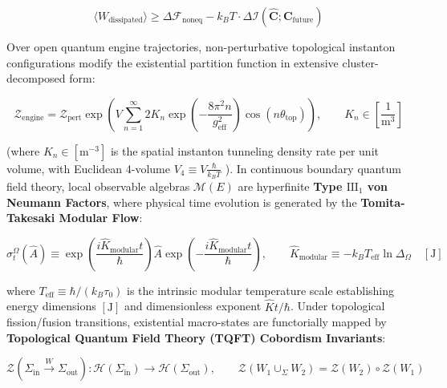 \documentclass[11pt,a4paper]{article}
\theoremstyle{definition}\newtheorem{definition}{Definition}
\theoremstyle{remark}\newtheorem{remark}{Remark}
\begin{document}
\begin{equation}
\langle W_{\text{dissipated}} \rangle \ge \Delta \mathcal{F}_{\text{noneq}} - k_B T \cdot \Delta \mathcal{I}(\hat{\mathbf{C}}; \mathbf{C}_{\text{future}})
\end{equation}


Over open quantum engine trajectories, non-perturbative topological instanton configurations modify the existential partition function in extensive cluster-decomposed form:


\begin{equation}
\boxed{\mathcal{Z}_{\text{engine}} = \mathcal{Z}_{\text{pert}} \exp\left( V \sum_{n=1}^\infty 2 K_n \exp\left( -\frac{8\pi^2 n}{g_{\text{eff}}^2} \right) \cos\left( n \theta_{\text{top}} \right) \right), \qquad K_n \in [\frac{1}{\mathrm{m^3}}]}
\end{equation}


(where $K_n \in [\mathrm{m^{-3}}]$ is the spatial instanton tunneling density rate per unit volume, with Euclidean 4-volume $V_4 \equiv V \frac{\hbar}{k_B T}$ ).
In continuous boundary quantum field theory, local observable algebras $\mathcal{M}(E)$ are hyperfinite \textbf{Type $\mathrm{III}_1$ von Neumann Factors}, where physical time evolution is generated by the \textbf{Tomita-Takesaki Modular Flow}:


\begin{equation}
\boxed{\sigma_t^{\Omega}(\hat{A}) \equiv \exp\left( \frac{i \hat{K}_{\text{modular}} t}{\hbar} \right) \hat{A} \exp\left( -\frac{i \hat{K}_{\text{modular}} t}{\hbar} \right), \qquad \hat{K}_{\text{modular}} \equiv -k_B T_{\text{eff}} \ln \Delta_{\Omega} \quad [\mathrm{J}]}
\end{equation}


where $T_{\text{eff}} \equiv \hbar / (k_B \tau_0)$ is the intrinsic modular temperature scale establishing energy dimensions $[\mathrm{J}]$ and dimensionless exponent $\hat{K}t/\hbar$. Under topological fission/fusion transitions, existential macro-states are functorially mapped by \textbf{Topological Quantum Field Theory (TQFT) Cobordism Invariants}:


\begin{equation}
\boxed{\mathcal{Z}\left( \Sigma_{\text{in}} \xrightarrow{W} \Sigma_{\text{out}} \right): \mathcal{H}\left(\Sigma_{\text{in}}\right) \longrightarrow \mathcal{H}\left(\Sigma_{\text{out}}\right), \qquad \mathcal{Z}\left(W_1 \cup_\Sigma W_2\right) = \mathcal{Z}(W_2) \circ \mathcal{Z}(W_1)}
\end{equation}
\end{document}

